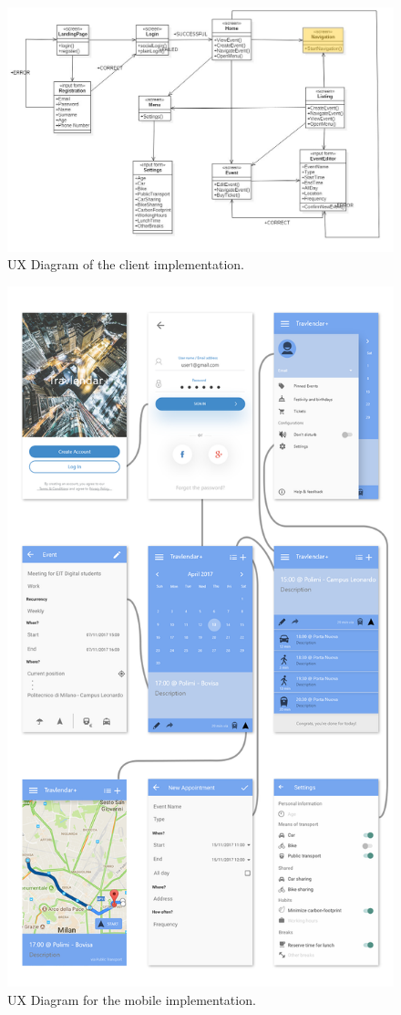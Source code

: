 \begin{figure}
	\centering
	\includegraphics[width=6in]{./diagrams/GeneralUxDiagram.jpg}
	\caption{UX Diagram of the client implementation.}
	\label{fig:generaluxdiag}
\end{figure}
\begin{figure}
	\centering
	\includegraphics[width=5in]{./diagrams/MobileUxDiagram.png}
	\caption{UX Diagram for the mobile implementation.}
	\label{fig:mobileuxdiag}
\end{figure}
